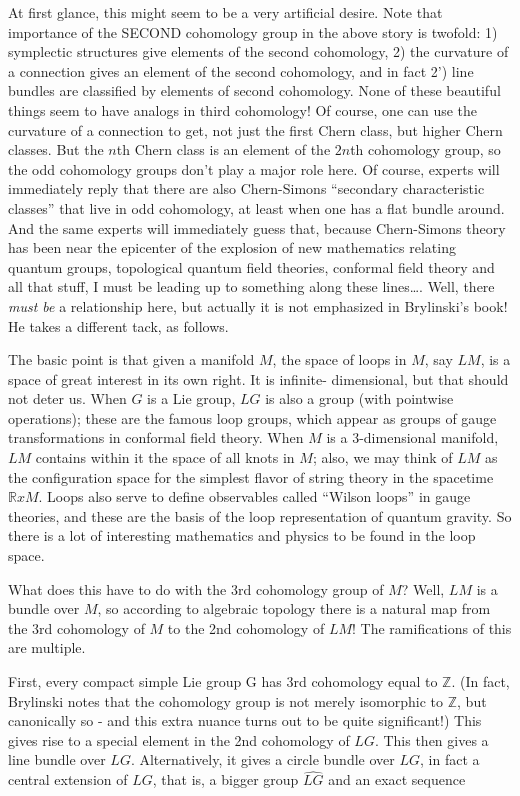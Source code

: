 \documentclass{article}
\begin{document}
At first glance, this might seem to be a very artificial desire. Note
that importance of the SECOND cohomology group in the above story is
twofold: 1) symplectic structures give elements of the second
cohomology, 2) the curvature of a connection gives an element of the
second cohomology, and in fact 2') line bundles are classified by
elements of second cohomology. None of these beautiful things seem to
have analogs in third cohomology! Of course, one can use the curvature
of a connection to get, not just the first Chern class, but higher Chern
classes. But the \(n\)th Chern class is an element of the \(2n\)th
cohomology group, so the odd cohomology groups don't play a major role
here. Of course, experts will immediately reply that there are also
Chern-Simons ``secondary characteristic classes'' that live in odd
cohomology, at least when one has a flat bundle around. And the same
experts will immediately guess that, because Chern-Simons theory has
been near the epicenter of the explosion of new mathematics relating
quantum groups, topological quantum field theories, conformal field
theory and all that stuff, I must be leading up to something along these
lines\ldots. Well, there \emph{must be} a relationship here, but
actually it is not emphasized in Brylinski's book! He takes a different
tack, as follows.

The basic point is that given a manifold \(M\), the space of loops in
\(M\), say \(LM\), is a space of great interest in its own right. It is
infinite- dimensional, but that should not deter us. When \(G\) is a Lie
group, \(LG\) is also a group (with pointwise operations); these are the
famous loop groups, which appear as groups of gauge transformations in
conformal field theory. When \(M\) is a 3-dimensional manifold, \(LM\)
contains within it the space of all knots in \(M\); also, we may think
of \(LM\) as the configuration space for the simplest flavor of string
theory in the spacetime \(\mathbb{R} x M\). Loops also serve to define
observables called ``Wilson loops'' in gauge theories, and these are the
basis of the loop representation of quantum gravity. So there is a lot
of interesting mathematics and physics to be found in the loop space.

What does this have to do with the 3rd cohomology group of \(M\)? Well,
\(LM\) is a bundle over \(M\), so according to algebraic topology there
is a natural map from the 3rd cohomology of \(M\) to the 2nd cohomology
of \(LM\)! The ramifications of this are multiple.

First, every compact simple Lie group G has 3rd cohomology equal to
\(\mathbb{Z}\). (In fact, Brylinski notes that the cohomology group is
not merely isomorphic to \(\mathbb{Z}\), but canonically so - and this
extra nuance turns out to be quite significant!) This gives rise to a
special element in the 2nd cohomology of \(LG\). This then gives a line
bundle over \(LG\). Alternatively, it gives a circle bundle over \(LG\),
in fact a central extension of \(LG\), that is, a bigger group
\(\widehat{LG}\) and an exact sequence
\end{document}
